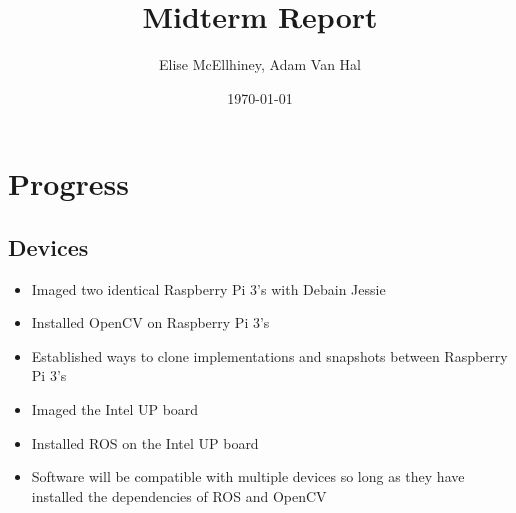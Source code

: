 \documentclass[11pt]{amsart}
\title{Midterm Report}
\author{Elise McEllhiney, Adam Van Hal}
\date{\today}                                           %
\begin{document}
\maketitle

\section{Progress}
\subsection{Devices}
\begin{itemize}
\item Imaged two identical Raspberry Pi 3's with Debain Jessie
\item Installed OpenCV on Raspberry Pi 3's
\item Established ways to clone implementations and snapshots between Raspberry Pi 3's
\item Imaged the Intel UP board
\item Installed ROS on the Intel UP board
\item Software will be compatible with multiple devices so long as they have installed the dependencies of ROS and OpenCV
\end{itemize}
\end{document}
